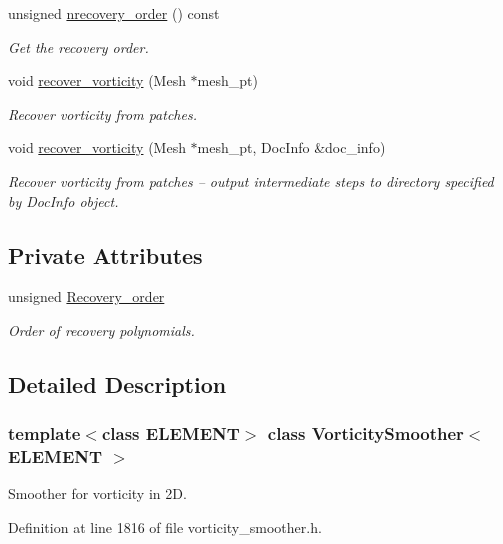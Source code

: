 \begin{DoxyCompactItemize}
unsigned \hyperlink{classVorticitySmoother_afd541244932a3f42dd4c59c2a8430058}{nrecovery\+\_\+order} () const
\begin{DoxyCompactList}\small\item\em Get the recovery order. \end{DoxyCompactList}\item 
void \hyperlink{classVorticitySmoother_a17be1c387c77c626bbc596dd5817afe4}{recover\+\_\+vorticity} (Mesh $\ast$mesh\+\_\+pt)
\begin{DoxyCompactList}\small\item\em Recover vorticity from patches. \end{DoxyCompactList}\item 
void \hyperlink{classVorticitySmoother_a8d51ff41709093afa9ff77b35b281cc7}{recover\+\_\+vorticity} (Mesh $\ast$mesh\+\_\+pt, Doc\+Info \&doc\+\_\+info)
\begin{DoxyCompactList}\small\item\em Recover vorticity from patches -- output intermediate steps to directory specified by Doc\+Info object. \end{DoxyCompactList}\end{DoxyCompactItemize}
\subsection*{Private Attributes}
\begin{DoxyCompactItemize}
\item 
unsigned \hyperlink{classVorticitySmoother_ab7d4c2895687d645f42694d2008b8efe}{Recovery\+\_\+order}
\begin{DoxyCompactList}\small\item\em Order of recovery polynomials. \end{DoxyCompactList}\end{DoxyCompactItemize}


\subsection{Detailed Description}
\subsubsection*{template$<$class E\+L\+E\+M\+E\+NT$>$\newline
class Vorticity\+Smoother$<$ E\+L\+E\+M\+E\+N\+T $>$}

Smoother for vorticity in 2D. 

Definition at line 1816 of file vorticity\+\_\+smoother.\+h.



